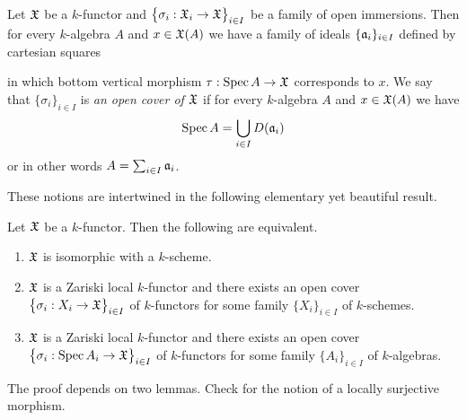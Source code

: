 \begin{definition}
Let ${\mathfrak X}$ be a $k$-functor and $\big\{\sigma_i:{\mathfrak X}_i\rightarrow {\mathfrak X}\big\}_{i\in I}$ be a family of open immersions. Then for every $k$-algebra $A$ and $x\in {\mathfrak X}(A)$ we have a family of ideals $\{\mathfrak{a}_i\}_{i\in I}$ defined by cartesian squares
\begin{center}
\end{center}
in which bottom vertical morphism $\tau:\mathrm{Spec}\, A \rightarrow {\mathfrak X}$ corresponds to $x$. We say that $\{\sigma_i\}_{i\in I}$ is \textit{an open cover of ${\mathfrak X}$} if for every $k$-algebra $A$ and $x\in {\mathfrak X}(A)$ we have
$$\mathrm{Spec}\, A = \bigcup_{i\in I}D(\mathfrak{a}_i)$$
or in other words $A = \sum_{i\in I}\mathfrak{a}_i$.
\end{definition}
\noindent
These notions are intertwined in the following elementary yet beautiful result.

\begin{theorem}\label{theorem:representability_basic_result}
Let ${\mathfrak X}$ be a $k$-functor. Then the following are equivalent.
\begin{enumerate}[label=\emph{\textbf{(\roman*)}}, leftmargin=3.0em]
\item ${\mathfrak X}$ is isomorphic with a $k$-scheme.
\item ${\mathfrak X}$ is a Zariski local $k$-functor and there exists an open cover $\big\{\sigma_i:X_i \rightarrow {\mathfrak X}\big\}_{i\in I}$ of $k$-functors for some family $\{X_i\}_{i\in I}$ of $k$-schemes.
\item ${\mathfrak X}$ is a Zariski local $k$-functor and there exists an open cover $\big\{\sigma_i:\mathrm{Spec}\, A_i \rightarrow {\mathfrak X}\big\}_{i\in I}$ of $k$-functors for some family $\{A_i\}_{i\in I}$ of $k$-algebras.
\end{enumerate}
\end{theorem}
\noindent
The proof depends on two lemmas. Check {\cite[Definition 7.1]{Sheaves}} for the notion of a locally surjective morphism.

